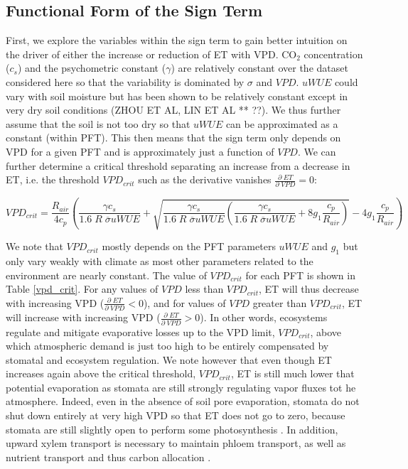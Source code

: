 \documentclass[draft,linenumbers]{gcbjournal}
\begin{document}
\subsection{Functional Form of the Sign Term}
\label{sign_term}
First, we explore the variables within the sign term to gain better intuition on the driver of either the increase or reduction of ET with VPD. CO$_2$ concentration ($c_s$) and the psychometric constant ($\gamma$) are relatively constant over the dataset considered here so that the variability is dominated by $\sigma$ and $VPD$. $uWUE$ could vary with soil moisture but has been shown to be relatively constant except in very dry soil conditions  (ZHOU ET AL, LIN ET AL ** ??). We thus further assume that the soil is not too dry so that $uWUE$ can be approximated as a constant (within PFT). This then means that the sign term only depends on VPD for a given PFT and is approximately just a function of $VPD$. We can further determine a critical threshold separating an increase from a decrease in ET, i.e. the threshold $VPD_{crit}$ such as the derivative vanishes $\frac{\partial \; ET}{\partial \; VPD} = 0$:
\small
\begin{linenomath*}
  \begin{equation}
VPD_{crit} = \frac{R_{air}}{4 c_p} \left( \frac{\gamma c_s}{1.6\; R \; \overline{\sigma} uWUE} + \sqrt{\frac{\gamma c_s}{1.6\; R \; \overline{\sigma} uWUE}\left( \frac{\gamma c_s}{1.6\; R \; \overline{\sigma} uWUE} + 8 g_1 \frac{c_p}{R_{air}}\right)} - 4 g_1 \frac{c_p}{R_{air}} \right)
\label{vpd_min_et}
  \end{equation}
\end{linenomath*}
\normalsize
We note that $VPD_{crit}$ mostly depends on the PFT parameters $uWUE$ and $g_1$ but only vary weakly with climate as most other parameters related to the environment are nearly constant. The value of $VPD_{crit}$ for each PFT is shown in Table \ref{vpd_crit}. For any values of $VPD$ less than $VPD_{crit}$, ET will thus decrease with increasing VPD ($\frac{\partial \; ET}{\partial \; VPD} < 0$), and for values of $VPD$ greater than $VPD_{crit}$, ET will increase with increasing VPD ($\frac{\partial \; ET}{\partial \; VPD} > 0$). In other words, ecosystems regulate and mitigate evaporative losses up to the VPD limit, $VPD_{crit}$, above which atmospheric demand is just too high to be entirely compensated by stomatal and ecosystem regulation. We note however that even though ET increases again above the critical threshold, $VPD_{crit}$, ET is still much lower that potential evaporation as stomata are still strongly regulating vapor fluxes tot he atmosphere. Indeed, even in the absence of soil pore evaporation, stomata do not shut down entirely at very high VPD so that ET does not go to zero, because stomata are still slightly open to perform some photosynthesis \citep{Ball_1987, Leuning_1990, MEDLYN_2011}. In addition, upward xylem transport is necessary to maintain phloem transport, as well as nutrient transport and thus carbon allocation \citep{De_2013, Nikinmaa_2013, Ryan_2014}.
\end{document}

